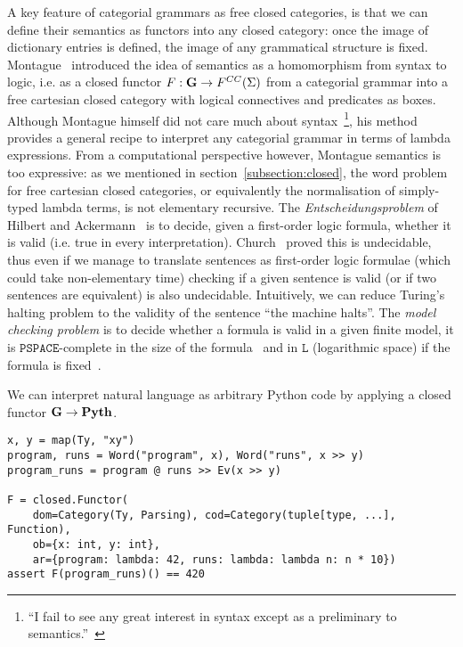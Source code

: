 A key feature of categorial grammars as free closed categories, is that we can define their semantics as functors into any closed category: once the image of dictionary entries is defined, the image of any grammatical structure is fixed.
Montague~\cite{Montague70a,Montague70,Montague73} introduced the idea of semantics as a homomorphism from syntax to logic, i.e. as a closed functor $F : \mathbf{G} \to F^{CC}(\Sigma)$ from a categorial grammar into a free cartesian closed category with logical connectives and predicates as boxes.
Although Montague himself did not care much about syntax~\footnote
{``I fail to see any great interest in syntax except as a preliminary to semantics.''~\cite{Montague70a}},
his method provides a general recipe to interpret any categorial grammar in terms of lambda expressions.
From a computational perspective however, Montague semantics is too expressive: as we mentioned in section~\ref{subsection:closed}, the word problem for free cartesian closed categories, or equivalently the normalisation of simply-typed lambda terms, is not elementary recursive.
The \emph{Entscheidungsproblem} of Hilbert and Ackermann~\cite{HilbertAckerman28} is to decide, given a first-order logic formula, whether it is valid (i.e. true in every interpretation).
Church~\cite{Church36} proved this is undecidable, thus even if we manage to translate sentences as first-order logic formulae (which could take non-elementary time) checking if a given sentence is valid (or if two sentences are equivalent) is also undecidable.
Intuitively, we can reduce Turing's halting problem to the validity of the sentence ``the machine halts''.
The \emph{model checking problem} is to decide whether a formula is valid in a given finite model, it is $\mathtt{PSPACE}$-complete in the size of the formula~\cite[Theorem~4.3]{Gradel02} and in $\mathtt{L}$ (logarithmic space) if the formula is fixed~\cite[Corollary~4.5]{Gradel02}.

\begin{example}
We can interpret natural language as arbitrary Python code by applying a closed functor $\mathbf{G} \to \mathbf{Pyth}$.

\begin{verbatim}
x, y = map(Ty, "xy")
program, runs = Word("program", x), Word("runs", x >> y)
program_runs = program @ runs >> Ev(x >> y)

F = closed.Functor(
    dom=Category(Ty, Parsing), cod=Category(tuple[type, ...], Function),
    ob={x: int, y: int},
    ar={program: lambda: 42, runs: lambda: lambda n: n * 10})
assert F(program_runs)() == 420
\end{verbatim}
\end{example}

